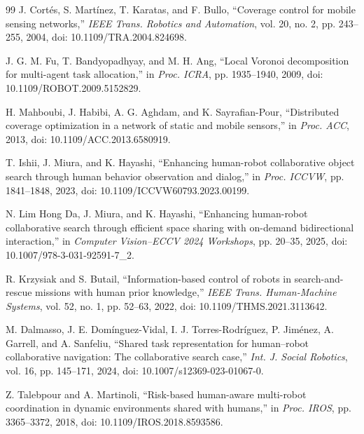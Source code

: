 \documentclass[conference]{IEEEtran}
\begin{document}
\begin{thebibliography}{99}
J. Cort\'es, S. Mart\'inez, T. Karatas, and F. Bullo, ``Coverage control for mobile sensing networks,'' \emph{IEEE Trans. Robotics and Automation}, vol. 20, no. 2, pp. 243--255, 2004, doi: 10.1109/TRA.2004.824698.

J. G. M. Fu, T. Bandyopadhyay, and M. H. Ang, ``Local Voronoi decomposition for multi-agent task allocation,'' in \emph{Proc. ICRA}, pp. 1935--1940, 2009, doi: 10.1109/ROBOT.2009.5152829.

H. Mahboubi, J. Habibi, A. G. Aghdam, and K. Sayrafian-Pour, ``Distributed coverage optimization in a network of static and mobile sensors,'' in \emph{Proc. ACC}, 2013, doi: 10.1109/ACC.2013.6580919.

T. Ishii, J. Miura, and K. Hayashi, ``Enhancing human-robot collaborative object search through human behavior observation and dialog,'' in \emph{Proc. ICCVW}, pp. 1841--1848, 2023, doi: 10.1109/ICCVW60793.2023.00199.

N. Lim Hong Da, J. Miura, and K. Hayashi, ``Enhancing human-robot collaborative search through efficient space sharing with on-demand bidirectional interaction,'' in \emph{Computer Vision--ECCV 2024 Workshops}, pp. 20--35, 2025, doi: 10.1007/978-3-031-92591-7\_2.

R. Krzysiak and S. Butail, ``Information-based control of robots in search-and-rescue missions with human prior knowledge,'' \emph{IEEE Trans. Human-Machine Systems}, vol. 52, no. 1, pp. 52--63, 2022, doi: 10.1109/THMS.2021.3113642.

M. Dalmasso, J. E. Dom\'inguez-Vidal, I. J. Torres-Rodr\'iguez, P. Jim\'enez, A. Garrell, and A. Sanfeliu, ``Shared task representation for human--robot collaborative navigation: The collaborative search case,'' \emph{Int. J. Social Robotics}, vol. 16, pp. 145--171, 2024, doi: 10.1007/s12369-023-01067-0.

Z. Talebpour and A. Martinoli, ``Risk-based human-aware multi-robot coordination in dynamic environments shared with humans,'' in \emph{Proc. IROS}, pp. 3365--3372, 2018, doi: 10.1109/IROS.2018.8593586.
\end{thebibliography}
\end{document}
